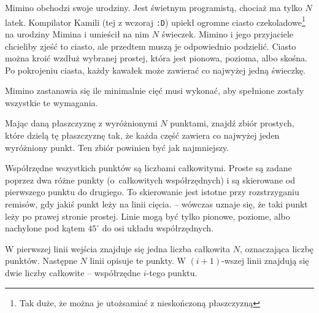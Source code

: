 

\usepackage[utf8]{inputenc}
\usepackage[T1]{fontenc}
\usepackage[polish]{babel}
\usepackage{polski}





Mimino obchodzi swoje urodziny.
Jest świetnym programistą, chociaż ma tylko $N$ latek.
Kompilator Kamili (tej z wczoraj \texttt{:D}) upiekł ogromne
	ciasto czekoladowe\footnote{Tak duże, że można je utożsamiać z nieskończoną płaszczyzną}
	na urodziny Mimina i umieścił na nim $N$ świeczek.
Mimino i jego przyjaciele chcieliby zjeść to ciasto, ale przedtem muszą je odpowiednio podzielić.
Ciasto można kroić wzdłuż wybranej prostej, która jest pionowa, pozioma, albo skośna.
Po pokrojeniu ciasta, każdy kawałek może zawierać co najwyżej jedną świeczkę.

Mimino zastanawia się ile minimalnie cięć musi wykonać, aby spełnione zostały wszystkie te wymagania.


Mając daną płaszczyznę z wyróżnionymi $N$ punktami, znajdź zbiór prostych,
	które dzielą tę płaszczyznę tak, że każda część zawiera co najwyżej jeden wyróżniony punkt.
Ten zbiór powinien być jak najmniejszy.

Współrzędne wszystkich punktów są liczbami całkowitymi.
Proste są zadane poprzez dwa różne punkty (o~całkowitych współrzędnych)
	i są skierowane od pierwszego punktu do drugiego.
To skierowanie jest istotne przy rozstrzyganiu remisów, gdy jakiś punkt leży na linii cięcia.
	-- wówczas uznaje się, że taki punkt leży po prawej stronie prostej.
Linie mogą być tylko pionowe, poziome, albo nachylone pod kątem $45^\circ$ do osi układu współrzędnych.


W pierwszej linii wejścia znajduje się jedna liczba całkowita $N$, oznaczająca liczbę punktów.
Następne $N$ linii opisuje te punkty.
W $(i+1)$-wszej linii znajdują się dwie liczby całkowite -- współrzędne $i$-tego punktu.


